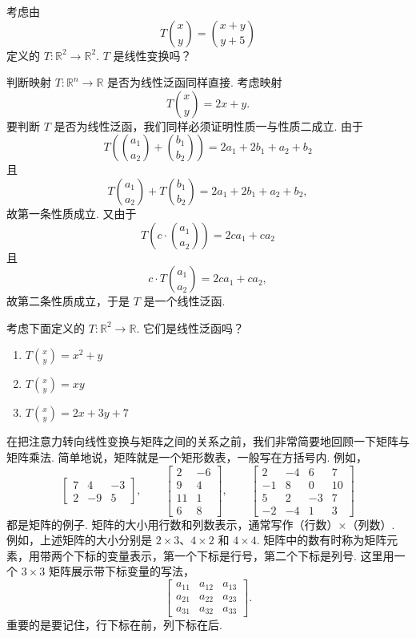 \begin{question}\label{q:1-4}
考虑由
\[
T\binom{x}{y}=\binom{x+y}{y+5}
\]
定义的 $T:\mathbb{R}^2\to\mathbb{R}^2$. $T$ 是线性变换吗？
\end{question}

判断映射 $T:\mathbb{R}^n\to\mathbb{R}$ 是否为线性泛函同样直接. 考虑映射
\[
T\binom{x}{y}=2x+y.
\]
要判断 $T$ 是否为线性泛函，我们同样必须证明性质一与性质二成立. 由于
\[
T\left(\binom{a_1}{a_2}+\binom{b_1}{b_2}\right)=2a_1+2b_1+a_2+b_2
\]
且
\[
T\binom{a_1}{a_2}+T\binom{b_1}{b_2}=2a_1+2b_1+a_2+b_2,
\]
故第一条性质成立. 又由于
\[
T\left(c\cdot\binom{a_1}{a_2}\right)=2ca_1+ca_2
\]
且
\[
c\cdot T\binom{a_1}{a_2}=2ca_1+ca_2,
\]
故第二条性质成立，于是 $T$ 是一个线性泛函.

\begin{question}\label{q:1-5}
考虑下面定义的 $T:\mathbb{R}^2\to\mathbb{R}$. 它们是线性泛函吗？
\begin{enumerate}
  \item[(a)] $T\binom{x}{y}=x^2+y$
  \item[(b)] $T\binom{x}{y}=xy$
  \item[(c)] $T\binom{x}{y}=2x+3y+7$
\end{enumerate}
\end{question}

在把注意力转向线性变换与矩阵之间的关系之前，我们非常简要地回顾一下矩阵与矩阵乘法. 简单地说，矩阵就是一个矩形数表，一般写在方括号内. 例如，
\[
\begin{bmatrix}7&4&-3\\2&-9&5\end{bmatrix},\qquad
\begin{bmatrix}2&-6\\9&4\\11&1\\6&8\end{bmatrix},\qquad
\begin{bmatrix}2&-4&6&7\\-1&8&0&10\\5&2&-3&7\\-2&-4&1&3\end{bmatrix}
\]
都是矩阵的例子. 矩阵的大小用行数和列数表示，通常写作（行数）$\times$（列数）. 例如，上述矩阵的大小分别是 $2\times3$、$4\times2$ 和 $4\times4$. 矩阵中的数有时称为矩阵元素，用带两个下标的变量表示，第一个下标是行号，第二个下标是列号. 这里用一个 $3\times3$ 矩阵展示带下标变量的写法，
\[
\begin{bmatrix}a_{11}&a_{12}&a_{13}\\a_{21}&a_{22}&a_{23}\\a_{31}&a_{32}&a_{33}\end{bmatrix}.
\]
重要的是要记住，行下标在前，列下标在后.

